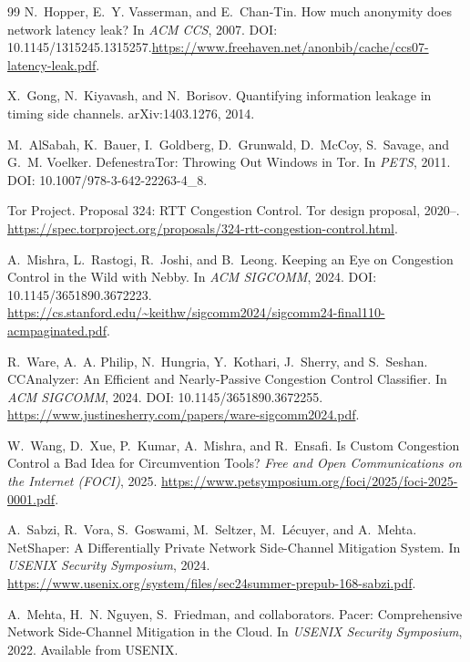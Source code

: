 \documentclass[11pt]{article}
\theoremstyle{definition}
\theoremstyle{remark}
\begin{document}
\begin{thebibliography}{99}
N.~Hopper, E.~Y. Vasserman, and E.~Chan-Tin.
\newblock How much anonymity does network latency leak?
\newblock In \emph{ACM CCS}, 2007.
\newblock DOI: 10.1145/1315245.1315257.\newblock \url{https://www.freehaven.net/anonbib/cache/ccs07-latency-leak.pdf}.

X.~Gong, N.~Kiyavash, and N.~Borisov.
\newblock Quantifying information leakage in timing side channels.
\newblock arXiv:1403.1276, 2014.

M.~AlSabah, K.~Bauer, I.~Goldberg, D.~Grunwald, D.~McCoy, S.~Savage, and G.~M. Voelker.
\newblock DefenestraTor: Throwing Out Windows in Tor.
\newblock In \emph{PETS}, 2011.
\newblock DOI: 10.1007/978-3-642-22263-4\_8.

Tor Project.
\newblock Proposal 324: RTT Congestion Control.
\newblock Tor design proposal, 2020--.
\newblock \url{https://spec.torproject.org/proposals/324-rtt-congestion-control.html}.

A.~Mishra, L.~Rastogi, R.~Joshi, and B.~Leong.
\newblock Keeping an Eye on Congestion Control in the Wild with Nebby.
\newblock In \emph{ACM SIGCOMM}, 2024.
\newblock DOI: 10.1145/3651890.3672223.
\newblock \url{https://cs.stanford.edu/~keithw/sigcomm2024/sigcomm24-final110-acmpaginated.pdf}.

R.~Ware, A.~A. Philip, N.~Hungria, Y.~Kothari, J.~Sherry, and S.~Seshan.
\newblock CCAnalyzer: An Efficient and Nearly-Passive Congestion Control Classifier.
\newblock In \emph{ACM SIGCOMM}, 2024.
\newblock DOI: 10.1145/3651890.3672255.
\newblock \url{https://www.justinesherry.com/papers/ware-sigcomm2024.pdf}.

W.~Wang, D.~Xue, P.~Kumar, A.~Mishra, and R.~Ensafi.
\newblock Is Custom Congestion Control a Bad Idea for Circumvention Tools?
\newblock \emph{Free and Open Communications on the Internet (FOCI)}, 2025.
\newblock \url{https://www.petsymposium.org/foci/2025/foci-2025-0001.pdf}.

A.~Sabzi, R.~Vora, S.~Goswami, M.~Seltzer, M.~L\'ecuyer, and A.~Mehta.
\newblock NetShaper: A Differentially Private Network Side-Channel Mitigation System.
\newblock In \emph{USENIX Security Symposium}, 2024.
\newblock \url{https://www.usenix.org/system/files/sec24summer-prepub-168-sabzi.pdf}.


A.~Mehta, H.~N. Nguyen, S.~Friedman, and collaborators.
\newblock Pacer: Comprehensive Network Side-Channel Mitigation in the Cloud.
\newblock In \emph{USENIX Security Symposium}, 2022.
\newblock Available from USENIX.


\end{thebibliography}
\end{document}
